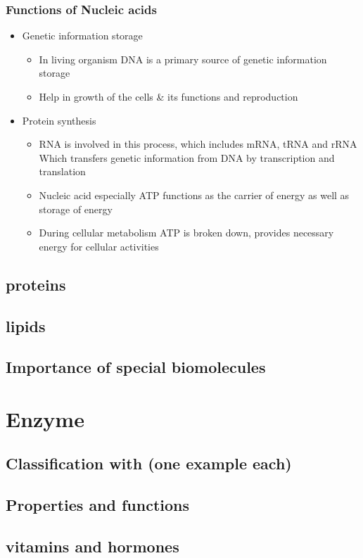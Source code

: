 \documentclass{article}
\begin{document}
	\subsubsection{Functions of Nucleic acids}
	\begin{itemize}
		\item Genetic information storage
			\begin{itemize}
				\item In living organism DNA is a primary source of genetic information storage
				\item Help in growth of the cells \& its functions and reproduction
			\end{itemize}
		\item Protein synthesis
			\begin{itemize}
				\item RNA is involved in this process, which includes mRNA, tRNA and rRNA
					\newline Which transfers genetic information from DNA by transcription
					and translation
				\item Nucleic acid especially ATP functions as the carrier of energy as well as
					storage of energy
				\item During cellular metabolism ATP is broken down, provides necessary energy
					for cellular activities
			\end{itemize}
	\end{itemize}

	\subsection{proteins}
	\subsection{lipids}
	\subsection{Importance of special biomolecules}

	\section{Enzyme}
	\subsection{Classification with (one example each)}
	\subsection{Properties and functions}
	\subsection{vitamins and hormones}
\end{document}
